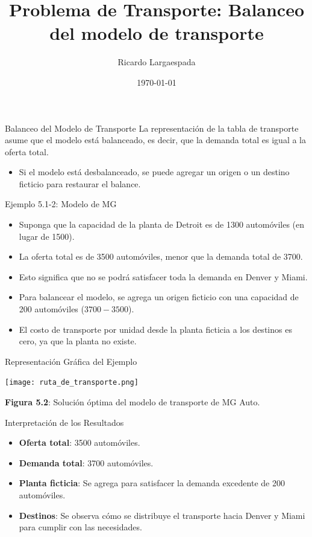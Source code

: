 \documentclass{beamer}
\title{Problema de Transporte: Balanceo del modelo de transporte}
\author{Ricardo Largaespada}
\date{\today}
\begin{document}
\frame{\titlepage}

\begin{frame}{Balanceo del Modelo de Transporte}
    La representación de la tabla de transporte asume que el modelo está balanceado, es decir, que la demanda total es igual a la oferta total.
    \begin{itemize}
        \item Si el modelo está desbalanceado, se puede agregar un origen o un destino ficticio para restaurar el balance.
    \end{itemize}
\end{frame}

\begin{frame}{Ejemplo 5.1-2: Modelo de MG}
    \begin{itemize}
        \item Suponga que la capacidad de la planta de Detroit es de 1300 automóviles (en lugar de 1500).
        \item La oferta total es de 3500 automóviles, menor que la demanda total de 3700.
        \item Esto significa que no se podrá satisfacer toda la demanda en Denver y Miami.
        \item Para balancear el modelo, se agrega un origen ficticio con una capacidad de 200 automóviles ($3700 - 3500$).
        \item El costo de transporte por unidad desde la planta ficticia a los destinos es cero, ya que la planta no existe.
    \end{itemize}
\end{frame}

\begin{frame}{Representación Gráfica del Ejemplo}
    \begin{center}
        \texttt{[image: ruta\_de\_transporte.png]} %
    \end{center}
    \textbf{Figura 5.2}: Solución óptima del modelo de transporte de MG Auto.
\end{frame}

\begin{frame}{Interpretación de los Resultados}
    \begin{itemize}
        \item \textbf{Oferta total}: 3500 automóviles.
        \item \textbf{Demanda total}: 3700 automóviles.
        \item \textbf{Planta ficticia}: Se agrega para satisfacer la demanda excedente de 200 automóviles.
        \item \textbf{Destinos}: Se observa cómo se distribuye el transporte hacia Denver y Miami para cumplir con las necesidades.
    \end{itemize}
\end{frame}
\end{document}
